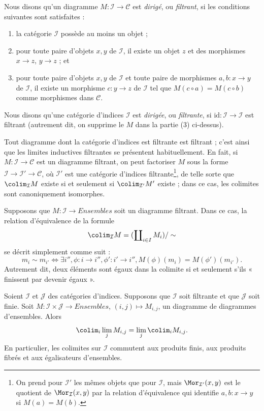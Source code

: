 \begin{definition}
\label{definition-directed}
Nous disons qu'un diagramme $M : \mathcal{I} \to \mathcal{C}$ est
{\it dirigé}, ou {\it filtrant}, si les conditions suivantes sont satisfaites :
\begin{enumerate}
\item la catégorie $\mathcal{I}$ possède au moins un objet ;
\item pour toute paire d'objets $x, y$ de $\mathcal{I}$,
il existe un objet $z$ et des morphismes $x \to z$,
$y \to z$ ; et
\item pour toute paire d'objets $x, y$ de $\mathcal{I}$
et toute paire de morphismes $a, b : x \to y$ de $\mathcal{I}$,
il existe un morphisme $c : y \to z$ de $\mathcal{I}$
tel que $M(c \circ a) = M(c \circ b)$ comme morphismes dans $\mathcal{C}$.
\end{enumerate}
Nous disons qu'une catégorie d'indices $\mathcal{I}$ est
{\it dirigée}, ou {\it filtrante}, si
$\text{id} : \mathcal{I} \to \mathcal{I}$ est filtrant
(autrement dit, on supprime le $M$ dans la partie (3) ci-dessus).
\end{definition}

\noindent
Tout diagramme dont la catégorie d'indices est filtrante est filtrant ;
c'est ainsi que les limites inductives filtrantes se présentent habituellement.
En fait, si $M : \mathcal{I} \to \mathcal{C}$ est un diagramme filtrant,
on peut factoriser $M$ sous la forme
$\mathcal{I} \to \mathcal{I}' \to \mathcal{C}$,
où $\mathcal{I}'$ est une catégorie d'indices
filtrante\footnote{On prend pour $\mathcal{I}'$ les mêmes objets que pour
$\mathcal{I}$, mais $\Mor_{\mathcal{I}'}(x, y)$ est le quotient de
$\Mor_\mathcal{I}(x, y)$ par la relation d'équivalence qui identifie
$a, b : x \to y$ si $M(a) = M(b)$.},
de telle sorte que $\colim_\mathcal{I} M$ existe si et seulement si
$\colim_{\mathcal{I}'} M'$ existe ; dans ce cas, les colimites sont
canoniquement isomorphes.

\medskip\noindent
Supposons que $M : \mathcal{I} \to \textit{Ensembles}$ soit un diagramme filtrant.
Dans ce cas, la relation d'équivalence de la formule
$$
\colim_\mathcal{I} M
=
(\coprod\nolimits_{i\in I} M_i)/\sim
$$
se décrit simplement comme suit :
$$
m_i \sim m_{i'}
\Leftrightarrow
\exists i'', \phi : i \to i'', \phi': i' \to i'',
M(\phi)(m_i) = M(\phi')(m_{i'}).
$$
Autrement dit, deux éléments sont égaux dans la colimite si et seulement
s'ils « finissent par devenir égaux ».

\begin{lemma}
\label{lemma-directed-commutes}
Soient $\mathcal{I}$ et $\mathcal{J}$ des catégories d'indices.
Supposons que $\mathcal{I}$ soit filtrante et que $\mathcal{J}$ soit finie.
Soit $M : \mathcal{I} \times \mathcal{J} \to \textit{Ensembles}$,
$(i, j) \mapsto M_{i, j}$, un diagramme de diagrammes d'ensembles.
Alors
$$
\colim_i \lim_j M_{i, j}
=
\lim_j \colim_i M_{i, j}.
$$
En particulier, les colimites sur $\mathcal{I}$ commutent aux produits finis,
aux produits fibrés et aux égalisateurs d'ensembles.
\end{lemma}

